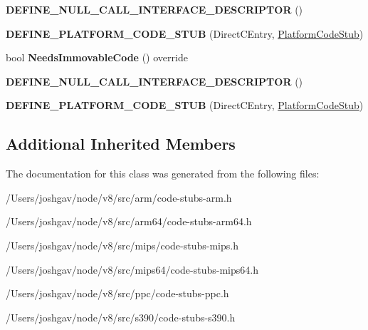 \begin{DoxyCompactItemize}
\item 
{\bfseries D\+E\+F\+I\+N\+E\+\_\+\+N\+U\+L\+L\+\_\+\+C\+A\+L\+L\+\_\+\+I\+N\+T\+E\+R\+F\+A\+C\+E\+\_\+\+D\+E\+S\+C\+R\+I\+P\+T\+OR} ()\hypertarget{classv8_1_1internal_1_1_direct_c_entry_stub_a2e23f5d604b369d53c99765704e01df0}{}\label{classv8_1_1internal_1_1_direct_c_entry_stub_a2e23f5d604b369d53c99765704e01df0}

\item 
{\bfseries D\+E\+F\+I\+N\+E\+\_\+\+P\+L\+A\+T\+F\+O\+R\+M\+\_\+\+C\+O\+D\+E\+\_\+\+S\+T\+UB} (Direct\+C\+Entry, \hyperlink{classv8_1_1internal_1_1_platform_code_stub}{Platform\+Code\+Stub})\hypertarget{classv8_1_1internal_1_1_direct_c_entry_stub_ae32a88d000afb47947a812cbad8d6a22}{}\label{classv8_1_1internal_1_1_direct_c_entry_stub_ae32a88d000afb47947a812cbad8d6a22}

\item 
bool {\bfseries Needs\+Immovable\+Code} () override\hypertarget{classv8_1_1internal_1_1_direct_c_entry_stub_a340e1e33a6ac2174c27d88a912d4ffa5}{}\label{classv8_1_1internal_1_1_direct_c_entry_stub_a340e1e33a6ac2174c27d88a912d4ffa5}

\item 
{\bfseries D\+E\+F\+I\+N\+E\+\_\+\+N\+U\+L\+L\+\_\+\+C\+A\+L\+L\+\_\+\+I\+N\+T\+E\+R\+F\+A\+C\+E\+\_\+\+D\+E\+S\+C\+R\+I\+P\+T\+OR} ()\hypertarget{classv8_1_1internal_1_1_direct_c_entry_stub_a2e23f5d604b369d53c99765704e01df0}{}\label{classv8_1_1internal_1_1_direct_c_entry_stub_a2e23f5d604b369d53c99765704e01df0}

\item 
{\bfseries D\+E\+F\+I\+N\+E\+\_\+\+P\+L\+A\+T\+F\+O\+R\+M\+\_\+\+C\+O\+D\+E\+\_\+\+S\+T\+UB} (Direct\+C\+Entry, \hyperlink{classv8_1_1internal_1_1_platform_code_stub}{Platform\+Code\+Stub})\hypertarget{classv8_1_1internal_1_1_direct_c_entry_stub_ae32a88d000afb47947a812cbad8d6a22}{}\label{classv8_1_1internal_1_1_direct_c_entry_stub_ae32a88d000afb47947a812cbad8d6a22}

\end{DoxyCompactItemize}
\subsection*{Additional Inherited Members}


The documentation for this class was generated from the following files\+:\begin{DoxyCompactItemize}
\item 
/\+Users/joshgav/node/v8/src/arm/code-\/stubs-\/arm.\+h\item 
/\+Users/joshgav/node/v8/src/arm64/code-\/stubs-\/arm64.\+h\item 
/\+Users/joshgav/node/v8/src/mips/code-\/stubs-\/mips.\+h\item 
/\+Users/joshgav/node/v8/src/mips64/code-\/stubs-\/mips64.\+h\item 
/\+Users/joshgav/node/v8/src/ppc/code-\/stubs-\/ppc.\+h\item 
/\+Users/joshgav/node/v8/src/s390/code-\/stubs-\/s390.\+h\end{DoxyCompactItemize}
